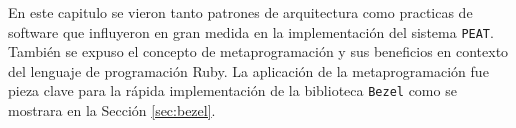 En este capitulo se vieron tanto patrones de arquitectura como practicas de software
que influyeron en gran medida en la implementación del sistema \texttt{PEAT}.
También se expuso el concepto de metaprogramación y sus beneficios en contexto del
lenguaje de programación Ruby. La aplicación de la metaprogramación fue pieza clave
para la rápida implementación de la biblioteca \texttt{Bezel} como se mostrara en la
Sección \ref{sec:bezel}.
